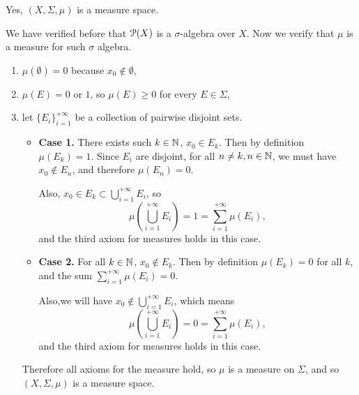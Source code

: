 Yes, \((X, \Sigma, \mu)\) is a measure space.

We have verified before that \(\mathcal{P}(X)\) is a \(\sigma\)-algebra over \(X\). Now we verify that \(\mu\) is a measure for such \(\sigma\) algebra.
\begin{enumerate}
    \item \(\mu(\emptyset) = 0\) because \(x_0 \notin \emptyset\),
    \item \(\mu(E) = 0\) or \(1\), so \(\mu(E) \geq 0\) for every \(E \in \Sigma\),
    \item let \(\{E_i\}_{i = 1}^{+\infty}\) be a collection of pairwise disjoint sets.
    \begin{itemize}
        \item \textbf{Case 1.} There exists such \(k \in \mathbb{N}\), \(x_0 \in E_k\). Then by definition \(\mu(E_k) = 1\). Since \(E_i\) are disjoint, for all \(n \neq k, n \in \mathbb{N}\), we must have \(x_0 \notin E_n\), and therefore \(\mu(E_n) = 0\).

        Also, \(x_0 \in E_k \subset \bigcup_{i = 1}^{+\infty} E_i\), so
        \[
        \mu\left(\bigcup_{i = 1}^{+\infty} E_i\right) = 1 = \sum_{i = 1}^{+\infty} \mu(E_i),
        \]
        and the third axiom for measures holds in this case.
        
        \item \textbf{Case 2.} For all \(k \in \mathbb{N}\), \(x_0 \notin E_k\). Then by definition \(\mu(E_k) = 0\) for all \(k\), and the sum \(\sum_{i = 1}^{+\infty} \mu(E_i) = 0\).

        Also,we will have \(x_0 \notin \bigcup_{i = 1}^{+\infty} E_i\), which means
        \[
            \mu\left(\bigcup_{i = 1}^{+\infty} E_i\right) = 0 = \sum_{i = 1}^{+\infty} \mu(E_i),
        \]
        and the third axiom for measures holds in this case.
    \end{itemize}

    Therefore all axioms for the measure hold, so \(\mu\) is a measure on \(\Sigma\), and so \((X, \Sigma, \mu)\) is a measure space.
\end{enumerate}
